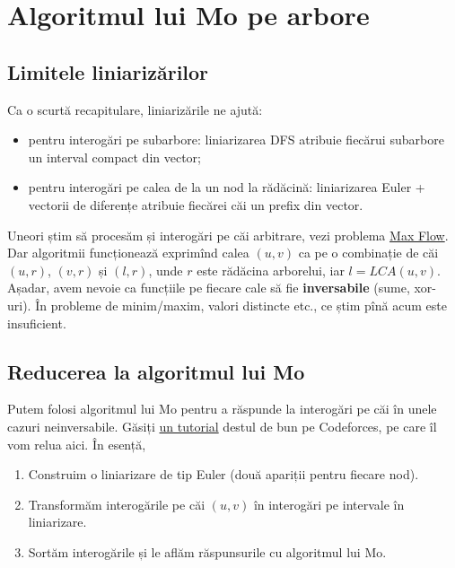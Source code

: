 \documentclass[../main.tex]{subfiles}
\begin{document}
\chapter{Algoritmul lui Mo pe arbore}

\section{Limitele liniarizărilor}

Ca o scurtă recapitulare, liniarizările ne ajută:

\begin{itemize}
  \item pentru interogări pe subarbore: liniarizarea DFS atribuie fiecărui subarbore un interval compact din vector;

  \item pentru interogări pe calea de la un nod la rădăcină: liniarizarea Euler + vectorii de diferențe atribuie fiecărei căi un prefix din vector.
\end{itemize}

Uneori știm să procesăm și interogări pe căi arbitrare, vezi problema \hyperref[problem:max-flow]{Max Flow}. Dar algoritmii funcționează exprimînd calea $(u,v)$ ca pe o combinație de căi $(u,r)$, $(v,r)$ și $(l,r)$, unde $r$ este rădăcina arborelui, iar $l = LCA(u,v)$. Așadar, avem nevoie ca funcțiile pe fiecare cale să fie \textbf{inversabile} (sume, xor-uri). În probleme de minim/maxim, valori distincte etc., ce știm pînă acum este insuficient.

\section{Reducerea la algoritmul lui Mo}

Putem folosi algoritmul lui Mo pentru a răspunde la interogări pe căi în unele cazuri neinversabile. Găsiți \href{https://codeforces.com/blog/entry/43230}{un tutorial} destul de bun pe Codeforces, pe care îl vom relua aici. În esență,

\begin{enumerate}
  \item Construim o liniarizare de tip Euler (două apariții pentru fiecare nod).
  \item Transformăm interogările pe căi $(u,v)$ în interogări pe intervale în liniarizare.
  \item Sortăm interogările și le aflăm răspunsurile cu algoritmul lui Mo.
\end{enumerate}
\end{document}
